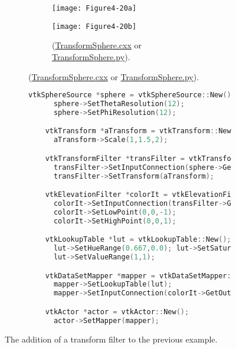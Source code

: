 \begin{figure}[htb]
    \centering
    \begin{subfigure}[h]{0.96\linewidth}
      \begin{subfigure}[h]{0.48\linewidth}
        \texttt{[image: Figure4-20a]}
        \caption*{}
        \label{fig:Figure4-20a}
      \end{subfigure}
      \hfill
      \begin{subfigure}[h]{0.48\linewidth}
        \texttt{[image: Figure4-20b]}
        \caption*{(\href{https://lorensen.github.io/VTKExamples/site/Cxx/Rendering/TransformSphere/}{TransformSphere.cxx} or \href{https://lorensen.github.io/VTKExamples/site/Python/Rendering/TransformSphere/}{TransformSphere.py}).}
        \label{fig:Figure4-20b}
      \end{subfigure}
  \end{subfigure}
  \hfill
  \begin{subfigure}[h]{0.76\linewidth}
    \begin{lstlisting}[language=C++, caption={Warped Sphere.}]
    vtkSphereSource *sphere = vtkSphereSource::New();
      sphere->SetThetaResolution(12);
      sphere->SetPhiResolution(12);

    vtkTransform *aTransform = vtkTransform::New();
      aTransform->Scale(1,1.5,2);

    vtkTransformFilter *transFilter = vtkTransformFilter::New();
      transFilter->SetInputConnection(sphere->GetOutputPort());
      transFilter->SetTransform(aTransform);

    vtkElevationFilter *colorIt = vtkElevationFilter::New();
      colorIt->SetInputConnection(transFilter->GetOutputPort());
      colorIt->SetLowPoint(0,0,-1);
      colorIt->SetHighPoint(0,0,1);

    vtkLookupTable *lut = vtkLookupTable::New();
      lut->SetHueRange(0.667,0.0); lut->SetSaturationRange(1,1);
      lut->SetValueRange(1,1);

    vtkDataSetMapper *mapper = vtkDataSetMapper::New();
      mapper->SetLookupTable(lut);
      mapper->SetInputConnection(colorIt->GetOutputPort());

    vtkActor *actor = vtkActor::New();
      actor->SetMapper(mapper);
    \end{lstlisting}
    \caption*{}
    \label{fig:Figure4-20c}
  \end{subfigure}
  \caption{The addition of a transform filter to the previous example.}\label{fig:Figure4-20}
\end{figure}

